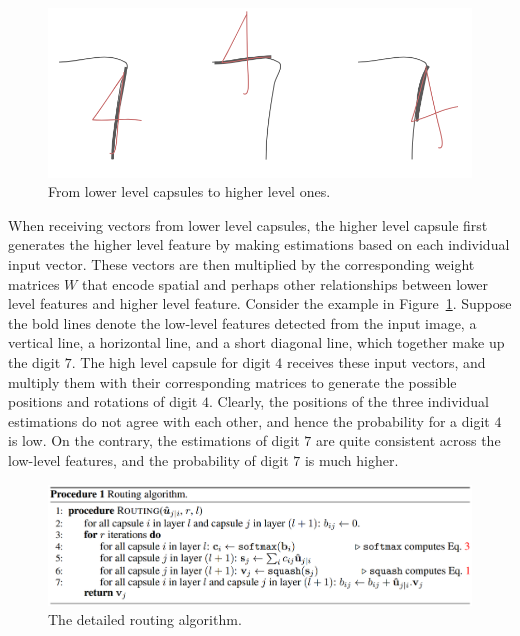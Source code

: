 \documentclass{article}
\begin{document}
\begin{figure}[!htb]
	\centering\includegraphics[width=.8\textwidth]{fig/routing}
	\caption{From lower level capsules to higher level ones.}\label{fig:routing}
\end{figure}

When receiving vectors from lower level capsules, the higher level capsule first generates the higher level feature by making estimations based on each individual input vector. These vectors are then multiplied by the corresponding weight matrices $W$ that encode spatial and perhaps other relationships between lower level features and higher level feature. Consider the example in Figure~\ref{fig:routing}. Suppose the bold lines denote the low-level features detected from the input image, a vertical line, a horizontal line, and a short diagonal line, which together make up the digit $7$. The high level capsule for digit $4$ receives these input vectors, and multiply them with their corresponding matrices to generate the possible positions and rotations of digit $4$. Clearly, the positions of the three individual estimations do not agree with each other, and hence the probability for a digit $4$ is low. On the contrary, the estimations of digit $7$ are quite consistent across the low-level features, and the probability of digit $7$ is much higher. 

\begin{figure}[!htb]
	\centering\includegraphics[width=\textwidth]{fig/algorithm}
	\caption{The detailed routing algorithm.}\label{fig:algorithm}
\end{figure}
\end{document}
